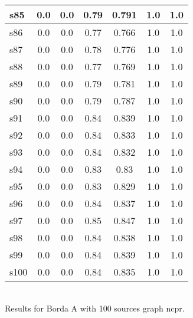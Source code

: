 \documentclass{article}
\begin{document}
\begin{tabular}{|l|c|c|c|c|c|c|}
\hline
s85 &0.0 & 0.0 & 0.79 & 0.791 & 1.0 & 1.0\\
\hline
s86 &0.0 & 0.0 & 0.77 & 0.766 & 1.0 & 1.0\\
\hline
s87 &0.0 & 0.0 & 0.78 & 0.776 & 1.0 & 1.0\\
\hline
s88 &0.0 & 0.0 & 0.77 & 0.769 & 1.0 & 1.0\\
\hline
s89 &0.0 & 0.0 & 0.79 & 0.781 & 1.0 & 1.0\\
\hline
s90 &0.0 & 0.0 & 0.79 & 0.787 & 1.0 & 1.0\\
\hline
s91 &0.0 & 0.0 & 0.84 & 0.839 & 1.0 & 1.0\\
\hline
s92 &0.0 & 0.0 & 0.84 & 0.833 & 1.0 & 1.0\\
\hline
s93 &0.0 & 0.0 & 0.84 & 0.832 & 1.0 & 1.0\\
\hline
s94 &0.0 & 0.0 & 0.83 & 0.83 & 1.0 & 1.0\\
\hline
s95 &0.0 & 0.0 & 0.83 & 0.829 & 1.0 & 1.0\\
\hline
s96 &0.0 & 0.0 & 0.84 & 0.837 & 1.0 & 1.0\\
\hline
s97 &0.0 & 0.0 & 0.85 & 0.847 & 1.0 & 1.0\\
\hline
s98 &0.0 & 0.0 & 0.84 & 0.838 & 1.0 & 1.0\\
\hline
s99 &0.0 & 0.0 & 0.84 & 0.839 & 1.0 & 1.0\\
\hline
s100 &0.0 & 0.0 & 0.84 & 0.835 & 1.0 & 1.0\\
\hline
\end{tabular}\\

\noindent Results for Borda A with 100 sources graph ncpr.
\end{document}
